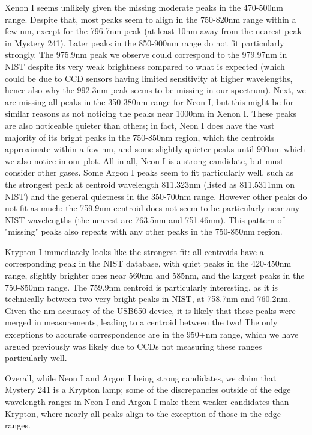 \documentclass[twocolumn]{aastex702}
\begin{document}
			Xenon I seems unlikely given the missing moderate peaks in the 470-500nm range. Despite that, most peaks seem to align in the 750-820nm range within a few nm, except for the 796.7nm peak (at least 10nm away from the nearest peak in Mystery 241). Later peaks in the 850-900nm range do not fit particularly strongly. The 975.9nm peak we observe could correspond to the 979.97nm in NIST despite its very weak brightness compared to what is expected (which could be due to CCD sensors having limited sensitivity at higher wavelengths, hence also why the 992.3nm peak seems to be missing in our spectrum). Next, we are missing all peaks in the 350-380nm range for Neon I, but this might be for similar reasons as not noticing the peaks near 1000nm in Xenon I. These peaks are also noticeable quieter than others; in fact, Neon I does have the vast majority of its bright peaks in the 750-850nm region, which the centroids approximate within a few nm, and some slightly quieter peaks until 900nm which we also notice in our plot. All in all, Neon I is a strong candidate, but must consider other gases. Some Argon I peaks seem to fit particularly well, such as the strongest peak at centroid wavelength 811.323nm (listed as 811.5311nm on NIST) and the general quietness in the 350-700nm range. However other peaks do not fit as much: the 759.9nm centroid does not seem to be particularly near any NIST wavelengths (the nearest are 763.5nm and 751.46nm). This pattern of "missing" peaks also repeats with any other peaks in the 750-850nm region.

			Krypton I immediately looks like the strongest fit: all centroids have a corresponding peak in the NIST database, with quiet peaks in the 420-450nm range, slightly brighter ones near 560nm and 585nm, and the largest peaks in the 750-850nm range. The 759.9nm centroid is particularly interesting, as it is technically between two very bright peaks in NIST, at 758.7nm and 760.2nm. Given the nm accuracy of the USB650 device, it is likely that these peaks were merged in measurements, leading to a centroid between the two! The only exceptions to accurate correspondence are in the 950+nm range, which we have argued previously was likely due to CCDs not measuring these ranges particularly well.
			
			Overall, while Neon I and Argon I being strong candidates, we claim that Mystery 241 is a Krypton lamp; some of the discrepancies outside of the edge wavelength ranges in Neon I and Argon I make them weaker candidates than Krypton, where nearly all peaks align to the exception of those in the edge ranges.
			
\end{document}
